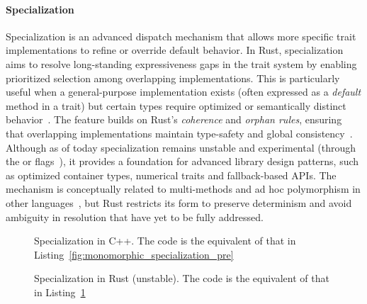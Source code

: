 \paragraph{Specialization}
Specialization is an advanced dispatch mechanism that allows more specific trait implementations to refine or override default behavior.
In Rust, specialization aims to resolve long-standing expressiveness gaps in the trait system by enabling prioritized selection among overlapping implementations.
This is particularly useful when a general-purpose implementation exists (often expressed as a \textit{default} method in a trait) but certain types require optimized or semantically distinct behavior~\cite{SpecializationRFC}.
The feature builds on Rust's \textit{coherence} and \textit{orphan rules}\cite{RustOrphanRules}, ensuring that overlapping implementations maintain type-safety and global consistency~\cite{Chlipala11}.
Although as of today specialization remains unstable and experimental (through the  or  flags~\cite{SpecializationRFC,MinSpecialization}), it provides a foundation for advanced library design patterns, such as optimized container types, numerical traits and fallback-based APIs.
The mechanism is conceptually related to multi-methods and ad hoc polymorphism in other languages~\cite{Chambers92,Castagna95}, but Rust restricts its form to preserve determinism and avoid ambiguity in resolution that have yet to be fully addressed.

\begin{figure}[htbp!]
	\centering
	\captionsetup{type=listing,skip=2pt}
	\caption{Specialization in C++. The code is the equivalent of that in Listing~\ref{fig:monomorphic_specialization_pre}}
	\label{fig:cpp-specialization}
\end{figure}

\begin{figure}[htbp!]
	\centering
	\captionsetup{type=listing,skip=2pt}
	\caption{Specialization in Rust (unstable). The code is the equivalent of that in Listing~\ref{fig:cpp-specialization}}
	\label{fig:rust-specialization}
\end{figure}


